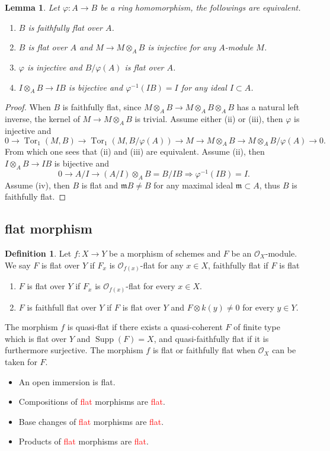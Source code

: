 \documentclass[leqno]{amsart}
\DeclareMathOperator{\Supp}{Supp}
\newcommand{\1}{\mathbf{1}}
\newcommand{\fm}{\mathfrak m}
\DeclareMathOperator{\Tor}{Tor}
\newtheorem{lem}[thm]{Lemma}
\theoremstyle{definition}
\newtheorem{defn}[thm]{Definition}
\theoremstyle{remark}
\newcommand{\red}[1]{\textcolor{Red}{#1}}
\begin{document}
\begin{lem}
	Let $\varphi\colon A\to B$ be a ring homomorphism,
	the followings are equivalent.
\begin{enumerate}
	\item $B$ is faithfully flat over $A$.
	\item $B$ is flat over $A$ and 
	 $M\to M\otimes_AB$ is injective for any  $A$-module $M$.
	\item  $\varphi$ is injective and 
	$B/\varphi(A)$ is flat over $A$.
	\item  $I\otimes_AB\to IB$ is bijective
	and  $\varphi^{-1}(IB)=I$ for any ideal $I\subset A$.
\end{enumerate}
\end{lem}
\begin{proof}
	When $B$ is faithfully flat,
	since $M\otimes_AB\to M\otimes_AB\otimes_AB$
	has a natural left inverse,
	the kernel of $M\to M\otimes_AB$ is trivial.
	Assume either (ii) or (iii),
	then $\varphi$ is injective and 
	\[
		 0\to\Tor_1(M,B)\to \Tor_1(M,B/\varphi(A))\to 
		 M\to M\otimes_AB\to M\otimes_AB/\varphi(A)\to 0.
	\]
	From which one sees that (ii) and (iii) are equivalent.
	Assume (ii), then $I\otimes_AB\to IB$ is bijective and
	\[
		0\to A/I\to (A/I)\otimes_AB=B/IB \Longrightarrow
		\varphi^{-1}(IB)=I.
	\]
	Assume (iv), then $B$ is flat 
	and  $\fm B\neq B$ for any maximal ideal  $\fm\subset A$,
	thus  $B$ is faithfully flat.
\end{proof}


\subsection{flat morphism}
\begin{defn}
	Let $f\colon X\to Y$ be a morphism of schemes
	and  $F$ be an $\mathcal{O}_X$-module.
	We say $F$ is flat over $Y$ if $F_x$ is  
	$\mathcal{O}_{f(x)}$-flat for any $x\in X$,
	faithfully flat if $F$ is flat 
	\begin{enumerate}
	\item $F$ is flat over $Y$ if $F_x$ is 
	$\mathcal{O}_{f(x)}$-flat for every $x\in X$.
	\item  $F$ is faithfull flat over $Y$ if 
	$F$ is flat over $Y$ and $F\otimes k(y)\neq 0$
	for every $y\in Y$.
	\end{enumerate}

	The morphism $f$ is quasi-flat if 
	there exists a quasi-coherent $F$ of finite type
	which is flat over $Y$ and $\Supp(F)=X$,
	and quasi-faithfully flat if it is furthermore surjective.
	The morphism $f$ is flat or faithfully flat
	when $\mathcal{O}_X$ can be taken for $F$.
\end{defn}
\begin{itemize}
	\item An open immersion is flat.
	\item Compositions of \red{flat} morphisms are \red{flat}.
	\item Base changes of \red{flat} morphisms are \red{flat}.
	\item Products of \red{flat} morphisms are \red{flat}.
\end{itemize}
\end{document}
